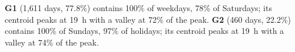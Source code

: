 \textbf{G1} (1,611 days, 77.8\%) contains 100\% of weekdays, 78\% of Saturdays; its centroid peaks at 19~h with a valley at 72\% of the peak. \textbf{G2} (460 days, 22.2\%) contains 100\% of Sundays, 97\% of holidays; its centroid peaks at 19~h with a valley at 74\% of the peak.
